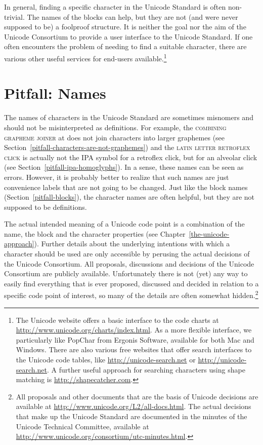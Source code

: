 In general, finding a specific character in the Unicode Standard is often non-trivial. 
The names of the blocks can help, but they are not (and were never supposed
to be) a foolproof structure. It is neither the goal nor the aim of the Unicode
Consortium to provide a user interface to the Unicode Standard. If one often
encounters the problem of needing to find a suitable character, there are
various other useful services for end-users available.\footnote{The Unicode
website offers a basic interface to the code charts at
\url{http://www.unicode.org/charts/index.html}. As a more flexible interface, we
particularly like PopChar from Ergonis Software, available for both Mac and
Windows. There are also various free websites that offer search interfaces
to the Unicode code tables, like \url{http://unicode-search.net} or
\url{http://unicode-search.net}. A further useful approach for searching characters
using shape matching is \url{http://shapecatcher.com}.}

\section{Pitfall: Names}
\label{pitfall-names}

The names of characters in the Unicode Standard are sometimes misnomers and
should not be misinterpreted as definitions. For example, the \textsc{combining
grapheme joiner} at  does not join characters into larger graphemes
(see Section~\ref{pitfall-characters-are-not-graphemes}) and the \textsc{latin
letter retroflex click}  is actually not the IPA symbol for a
retroflex click, but for an alveolar click (see
Section~\ref{pitfall-ipa-homoglyphs}). In a sense, these names can be seen as
errors. However, it is probably better to realize that such names are just
convenience labels that are not going to be changed. Just like the block names
(Section~\ref{pitfall-blocks}), the character names are often helpful, but they
are not supposed to be definitions.

The actual intended meaning of a Unicode code point is a combination of the
name, the block and the character properties (see
Chapter~\ref{the-unicode-approach}). Further details about the underlying intentions 
with which a character should be used
are only accessible by perusing the actual decisions of the Unicode Consortium.
All proposals, discussions and decisions of the Unicode Consortium are publicly
available. Unfortunately there is not (yet) any way to easily find everything
that is ever proposed, discussed and decided in relation to a specific
code point of interest, so many of the details are often somewhat
hidden.\footnote{All proposals and other documents that are the basis of Unicode
decisions are available at \url{http://www.unicode.org/L2/all-docs.html}. The
actual decisions that make up the Unicode Standard are documented in the minutes
of the Unicode Technical Committee, available at
\url{http://www.unicode.org/consortium/utc-minutes.html}.}

